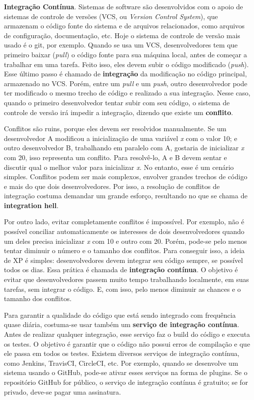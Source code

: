 \documentclass[
  11pt,
  twoside]{book}
\begin{document}
 \textbf{Integração Contínua}. Sistemas de
software são desenvolvidos com o apoio de sistemas de controle de
versões (VCS, ou \emph{Version Control System}), que armazenam o código
fonte do sistema e de arquivos relacionados, como arquivos de
configuração, documentação, etc. Hoje o sistema de controle de versão
mais usado é o git, por exemplo. Quando se usa um VCS, desenvolvedores
tem que primeiro baixar (\emph{pull}) o código fonte para sua máquina
local, antes de começar a trabalhar em uma tarefa. Feito isso, eles
devem subir o código modificado (\emph{push}). Esse último passo é
chamado de \textbf{integração} da modificação no código principal,
armazenado no VCS. Porém, entre um \emph{pull} e um \emph{push}, outro
desenvolvedor pode ter modificado o mesmo trecho de código e realizado a
sua integração. Nesse caso, quando o primeiro desenvolvedor tentar subir
com seu código, o sistema de controle de versão irá impedir a
integração, dizendo que existe um \textbf{conflito}.

Conflitos são ruins, porque eles devem ser resolvidos manualmente. Se um
desenvolvedor A modificou a inicialização de uma variável \emph{x} com o
valor 10; e outro desenvolvedor B, trabalhando em paralelo com A,
gostaria de inicializar \emph{x} com 20, isso representa um conflito.
Para resolvê-lo, A e B devem sentar e discutir qual o melhor valor para
inicializar \emph{x}. No entanto, esse é um cenário simples. Conflitos
podem ser mais complexos, envolver grandes trechos de código e mais do
que dois desenvolvedores. Por isso, a resolução de conflitos de
integração costuma demandar um grande esforço, resultando no que se
chama de \textbf{integration hell}.

Por outro lado, evitar completamente conflitos é impossível. Por
exemplo, não é possível conciliar automaticamente os interesses de dois
desenvolvedores quando um deles precisa inicializar \emph{x} com 10 e
outro com 20. Porém, pode-se pelo menos tentar diminuir o número e o
tamanho dos conflitos. Para conseguir isso, a ideia de XP é simples:
desenvolvedores devem integrar seu código sempre, se possível todos os
dias. Essa prática é chamada de \textbf{integração contínua}. O objetivo
é evitar que desenvolvedores passem muito tempo trabalhando localmente,
em suas tarefas, sem integrar o código. E, com isso, pelo menos diminuir
as chances e o tamanho dos conflitos.

Para garantir a qualidade do código que está sendo integrado com
frequência quase diária, costuma-se usar também um \textbf{serviço de
integração contínua}. Antes de realizar qualquer integração, esse
serviço faz o build do código e executa os testes. O objetivo é garantir
que o código não possui erros de compilação e que ele passa em todos os
testes. Existem diversos serviços de integração contínua, como Jenkins,
TravisCI, CircleCI, etc. Por exemplo, quando se desenvolve um sistema
usando o GitHub, pode-se ativar esses serviços na forma de plugins. Se o
repositório GitHub for público, o serviço de integração contínua é
gratuito; se for privado, deve-se pagar uma assinatura.
\end{document}
